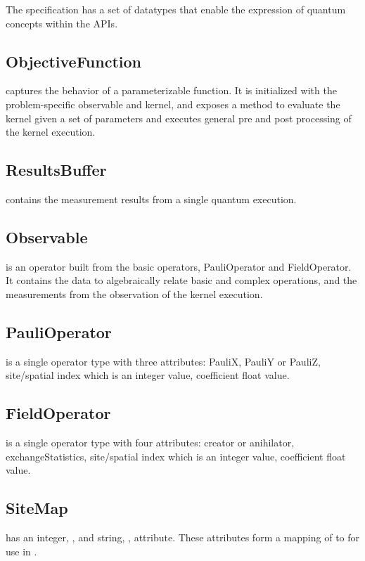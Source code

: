 The \qcor specification has a set of datatypes that enable the expression of quantum concepts within the \qcor \ac{API}s.\\

\subsection{\textbf{ObjectiveFunction}}\label{subsec:ObjectiveFunction}
 captures the behavior of a parameterizable function. It is initialized with the problem-specific observable and kernel, and exposes a method to evaluate the kernel given a set of parameters and executes general pre and post processing of the kernel execution.\\

\subsection{\textbf{ResultsBuffer}}\label{subsec:ResultsBuffer}
 contains the measurement results from a single quantum execution.\\

\subsection{\textbf{Observable}}\label{subsec:Observable}
 is an operator built from the basic operators, PauliOperator and FieldOperator. It contains the data to algebraically relate basic and complex operations, and the measurements from the observation of the kernel execution.\\

\subsection{\textbf{PauliOperator}}\label{subsec:PauliOperator}
 is a single operator type with three attributes: PauliX, PauliY or PauliZ, site/spatial index which is an integer value, coefficient float value.\\

\subsection{\textbf{FieldOperator}}\label{subsec:FieldOperator}
 is a single operator type with four attributes: creator or anihilator, exchangeStatistics, site/spatial index which is an integer value, coefficient float value.\\

\subsection{\textbf{SiteMap}}\label{subsec:Sitemap}
 has an integer, , and string, , attribute. These attributes form a mapping of  to  for use in \Clang.

